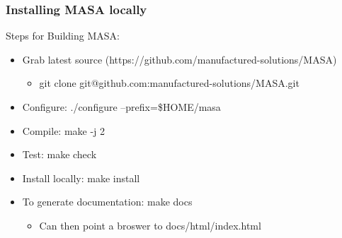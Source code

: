 \documentclass[mathserif]{beamer}
\begin{document}
\begin{frame}
  \frametitle{Installing MASA locally}
  \begin{block}{Steps for Building MASA:}
    \begin{itemize}
      \item Grab latest source (https://github.com/manufactured-solutions/MASA)
	    \begin{itemize}
	     \item git clone git@github.com:manufactured-solutions/MASA.git
	    \end{itemize}
      \item Configure: ./configure --prefix=\$HOME/masa %
      \item Compile: make -j 2
      \item Test: make check
      \item Install locally: make install
      \item To generate documentation: make docs 
	\begin{itemize}
	  \item Can then point a broswer to docs/html/index.html
	\end{itemize}
     \end{itemize}
   \end{block}

\begin{center}
\small
{}
\end{center}

\end{frame}
\end{document}
